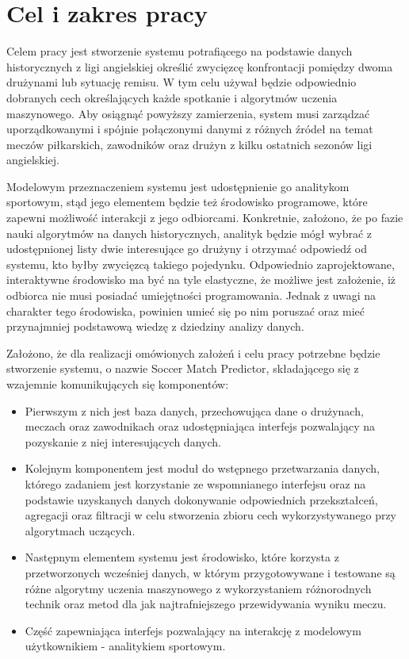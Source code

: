 \chapter{Cel i zakres pracy}

\noindent Celem pracy jest stworzenie systemu potrafiącego na podstawie danych historycznych z ligi angielskiej określić zwycięzcę konfrontacji pomiędzy dwoma drużynami lub sytuację remisu. W tym celu używał będzie odpowiednio dobranych cech określających każde spotkanie i algorytmów uczenia maszynowego. Aby osiągnąć powyższy zamierzenia, system musi zarządzać uporządkowanymi i spójnie połączonymi danymi z różnych źródeł na temat meczów piłkarskich, zawodników oraz drużyn z kilku ostatnich sezonów ligi angielskiej.

Modelowym przeznaczeniem systemu jest udostępnienie go analitykom sportowym, stąd jego elementem będzie też środowisko programowe, które zapewni możliwość interakcji z jego odbiorcami. Konkretnie, założono, że po fazie nauki algorytmów na danych historycznych, analityk będzie mógł wybrać z udostępnionej listy dwie interesujące go drużyny i otrzymać odpowiedź od systemu, kto byłby zwycięzcą takiego pojedynku. Odpowiednio zaprojektowane, interaktywne środowisko ma być na tyle elastyczne, że możliwe jest założenie, iż odbiorca nie musi posiadać umiejętności programowania. Jednak z uwagi na charakter tego środowiska, powinien umieć się po nim poruszać oraz mieć przynajmniej podstawową wiedzę z dziedziny analizy danych.


Założono, że dla realizacji omówionych założeń i celu pracy potrzebne będzie stworzenie systemu, o nazwie Soccer Match Predictor, składającego się z wzajemnie komunikujących się komponentów: 
\begin{itemize}
    \item  Pierwszym z nich jest baza danych, przechowująca dane o drużynach, meczach oraz zawodnikach oraz udostępniająca interfejs pozwalający na pozyskanie z niej interesujących danych. 
    \item Kolejnym komponentem jest moduł do wstępnego przetwarzania danych, którego zadaniem jest korzystanie ze wspomnianego interfejsu oraz na podstawie uzyskanych danych dokonywanie odpowiednich przekształceń, agregacji oraz filtracji w celu stworzenia zbioru cech wykorzystywanego przy algorytmach uczących.
    \item Następnym elementem systemu jest środowisko, które korzysta z przetworzonych wcześniej danych, w którym przygotowywane i testowane są różne algorytmy uczenia maszynowego z wykorzystaniem różnorodnych technik oraz metod dla jak najtrafniejszego przewidywania wyniku meczu.
    \item Część zapewniająca interfejs pozwalający na interakcję z modelowym użytkownikiem - analitykiem sportowym.
\end{itemize}

